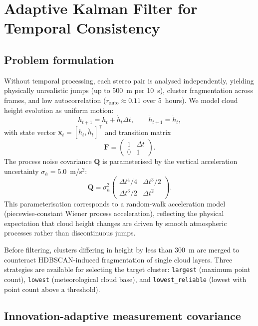 \documentclass[preprint,
superscriptaddress,
amsmath,amssymb,aps,
twoside,final,secnumarabic,
nofootinbib]{revtex4-2}
\begin{document}
\section{Adaptive Kalman Filter for Temporal Consistency}\label{sec:kalman}

\subsection{Problem formulation}

Without temporal processing, each stereo pair is analysed independently, yielding physically unrealistic jumps (up to 500~m per 10~s), cluster fragmentation across frames, and low autocorrelation ($r_\text{auto} \approx 0.11$ over 5~hours). We model cloud height evolution as uniform motion:
\begin{equation}
h_{t+1} = h_t + \dot{h}_t \Delta t, \qquad \dot{h}_{t+1} = \dot{h}_t,
\end{equation}
with state vector $\mathbf{x}_t = [h_t, \dot{h}_t]^\top$ and transition matrix
\begin{equation}
\mathbf{F} = \begin{pmatrix} 1 & \Delta t \\ 0 & 1 \end{pmatrix}.
\end{equation}
The process noise covariance $\mathbf{Q}$ is parameterised by the vertical acceleration uncertainty $\sigma_h = 5.0$~m/s$^2$:
\begin{equation}
\mathbf{Q} = \sigma_h^2 \begin{pmatrix} \Delta t^4/4 & \Delta t^3/2 \\ \Delta t^3/2 & \Delta t^2 \end{pmatrix}.
\end{equation}
This parameterisation corresponds to a random-walk acceleration model (piecewise-constant Wiener process acceleration), reflecting the physical expectation that cloud height changes are driven by smooth atmospheric processes rather than discontinuous jumps.

Before filtering, clusters differing in height by less than 300~m are merged to counteract HDBSCAN-induced fragmentation of single cloud layers. Three strategies are available for selecting the target cluster: \texttt{largest} (maximum point count), \texttt{lowest} (meteorological cloud base), and \texttt{lowest\_reliable} (lowest with point count above a threshold).

\subsection{Innovation-adaptive measurement covariance}
\end{document}
